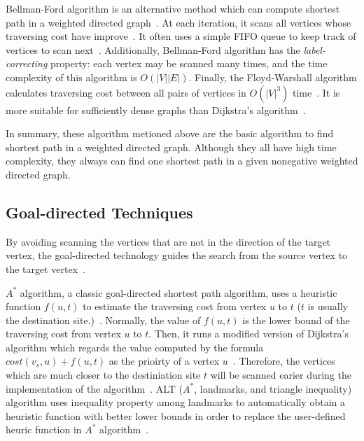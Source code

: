 \documentclass[conference]{IEEEtran}
\begin{document}
Bellman-Ford algorithm is an alternative method which can compute shortest path in a weighted directed graph~\cite{bellman1958routing, ford1956network}. At each iteration, it scans all vertices whose traversing cost have improve~\cite{bellman1958routing, ford1956network}. It often uses a simple FIFO queue to keep track of vertices to scan next~\cite{bast2016route}.  Additionally, Bellman-Ford algorithm has the \emph{label-correcting} property: each vertex may be scanned many times, and the time complexity of this algorithm is $O(|V||E|)$. Finally, the Floyd-Warshall algorithm calculates traversing cost between all pairs of vertices in $O(|V|^3)$ time~\cite{floyd1962algorithm}. It is more suitable for sufficiently dense graphs than Dijkstra's algorithm~\cite{bast2016route}.

In summary, these algorithm metioned above are the basic algorithm to find shortest path in a weighted directed graph. Although they all have high time complexity, they always can find one shortest path in a given nonegative weighted directed graph.
                         
\subsection{Goal-directed Techniques}
By avoiding scanning the vertices that are not in the direction of the target vertex, the goal-directed technology guides the search from the source vertex to the target vertex~\cite{bast2016route}.

$A^*$ algorithm, a classic goal-directed shortest path algorithm, uses a heuristic function $f(u,t)$ to estimate the traversing cost from vertex $u$ to $t$ ($t$ is usually the destination site.)~\cite{Hart1968formal}. Normally, the value of $f(u,t)$ is the lower bound of the traversing cost from vertex $u$ to $t$. Then, it runs a modified version of Dijkstra's algorithm which regards the value computed by the formula $cost(v_s, u)+f(u,t)$ as the prioirty of a vertex $u$~\cite{bast2016route}. Therefore, the vertices which are much closer to the destiniation site $t$ will be scanned earier during the implementation of the algorithm~\cite{bast2016route}. ALT ($A^*$, landmarks, and triangle inequality) algorithm uses inequality property among landmarks to automatically obtain a heuristic function with better lower bounds in order to replace the user-defined heuric function in $A^*$ algorithm~\cite{goldberg2005computing}. 
\end{document}
